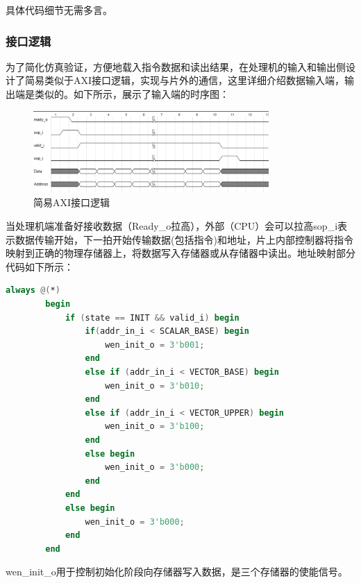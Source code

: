 \documentclass{article}
\begin{document}
    具体代码细节无需多言。

    \subsubsection{接口逻辑}
    为了简化仿真验证，方便地载入指令数据和读出结果，在处理机的输入和输出侧设计了简易类似于AXI接口逻辑，实现与片外的通信，这里详细介绍数据输入端，输出端是类似的。如下所示，展示了输入端的时序图：
    \begin{figure}[!ht]
        \centering
        \includegraphics[width = 0.8\textwidth]{Interface_Logic.png}
        \caption{简易AXI接口逻辑}
    \end{figure}
    
    当处理机端准备好接收数据（Ready\_o拉高），外部（CPU）会可以拉高sop\_i表示数据传输开始，下一拍开始传输数据(包括指令)和地址，片上内部控制器将指令映射到正确的物理存储器上，将数据写入存储器或从存储器中读出。地址映射部分代码如下所示：
    \begin{lstlisting}[language=Verilog]
        always @(*)
        begin
            if (state == INIT && valid_i) begin
                if(addr_in_i < SCALAR_BASE) begin
                    wen_init_o = 3'b001;
                end
                else if (addr_in_i < VECTOR_BASE) begin
                    wen_init_o = 3'b010;
                end
                else if (addr_in_i < VECTOR_UPPER) begin
                    wen_init_o = 3'b100;
                end
                else begin
                    wen_init_o = 3'b000;
                end
            end
            else begin
                wen_init_o = 3'b000;
            end
        end
    \end{lstlisting}
    
    wen\_init\_o用于控制初始化阶段向存储器写入数据，是三个存储器的使能信号。
\end{document}
